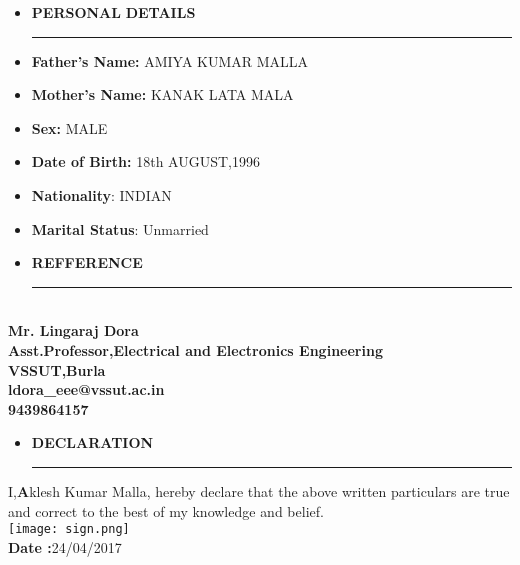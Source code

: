 \documentclass[a4paper]{article}
\begin{document}
 
 \renewcommand{\labelitemi}{\texttt{[image: jnj.JPG]}}
\begin{itemize}
  \vspace{4ex}
  \item \textbf{\huge{P}}\textbf{\large ERSONAL} \textbf{\huge{D}}\textbf{\large ETAILS}
  {\color{mypink1}
  \rule{\linewidth}{0.5mm}}
 \end{itemize}
 
 \renewcommand{\labelitemi}{\textbullet}
 \begin{itemize}

\item \textbf{ Father’s Name:} AMIYA KUMAR MALLA
\item\textbf {Mother’s Name:} KANAK LATA MALA
 \item\textbf {Sex:} MALE
\item \textbf  {Date of Birth:} 18th AUGUST,1996
\item\textbf {Nationality}: INDIAN
\item \textbf {Marital Status}: Unmarried

 \end{itemize}


 \renewcommand{\labelitemi}{\texttt{[image: jnj.JPG]}}
\begin{itemize}
  \vspace{4ex}
  \item \textbf{\huge{R}}\textbf{\large EFFERENCE} 
  {\color{mypink1}
  \rule{\linewidth}{0.5mm}}
 \end{itemize}
\indent
 

 \indent \\
\textbf {Mr. Lingaraj Dora}\\
 \textbf{ Asst.Professor,Electrical and Electronics Engineering} \\
\textbf {VSSUT,Burla}\\
\indent \faEnvelope \hspace{5pt}\textbf{ ldora\_eee@vssut.ac.in} \\
\indent \faMobile \hspace{5pt}\textbf{9439864157} \\

 \renewcommand{\labelitemi}{\texttt{[image: jnj.JPG]}}
\begin{itemize}
  \vspace{4ex}
  \item \textbf{\huge{D}}\textbf{\large ECLARATION} 
  {\color{mypink1}
  \rule{\linewidth}{0.5mm}}
 \end{itemize}
 I,\textbf Aklesh Kumar Malla, hereby declare that the above written particulars are true and correct to the best of my knowledge and belief. \\
 \texttt{[image: sign.png]}\\
\textbf{Date :}24/04/2017
\end{document}
